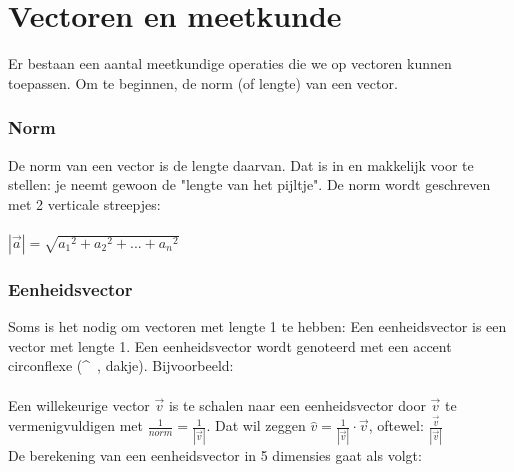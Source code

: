 

\section{Vectoren en meetkunde}
Er bestaan een aantal meetkundige operaties die we op vectoren kunnen toepassen.
Om  te beginnen, de norm (of lengte) van een vector.

\subsubsection{Norm}
De norm van een vector is de lengte daarvan. Dat is in \RD en \RT makkelijk  voor te stellen: je neemt gewoon de "lengte van het pijltje". De norm wordt geschreven met 2 verticale streepjes:\\ \\

{$|\vec{a}| = \sqrt{ {a_1}^{2} + {a_2}^{2} + . . . +{a_n}^{2}}$\\ }


\subsubsection{Eenheidsvector}
Soms is het nodig om vectoren met lengte 1 te hebben:
{Een eenheidsvector is een vector met lengte 1.}
Een eenheidsvector wordt genoteerd met een accent circonflexe (\textasciicircum \ , dakje). Bijvoorbeeld:\\ 

\\ 
Een willekeurige vector $ \vec{v} $  is te schalen naar een eenheidsvector door $ \vec{v} $   te vermenigvuldigen met $ \frac{1}{norm} =  \frac{1}{ |\vec{v}|} $. 
Dat wil zeggen $\hat{v} =  \frac{1}{|\vec{v}|}\cdot\vec{v}$, oftewel: $\frac{\vec{v}}{|\vec{v}|}$ \\
De berekening van een eenheidsvector in 5 dimensies gaat als volgt: \\ \\

